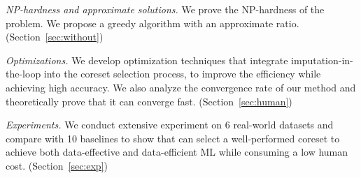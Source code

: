  	\item[(ii)] \textit{NP-hardness and approximate solutions.}
	We prove the NP-hardness of the problem. We propose a greedy algorithm with an approximate ratio. 
	(Section~\ref{sec:without})

	\item[(iii)] \textit{Optimizations.}
	We develop optimization techniques that integrate imputation-in-the-loop into the coreset selection process, to improve the efficiency while achieving high accuracy. We also analyze the convergence rate of our method and theoretically prove that it can converge fast. 
	(Section~\ref{sec:human})



	\item[(iv)] \textit{Experiments.}
	We conduct extensive experiment on 6 real-world datasets and compare with 10 baselines to show that \ours can select a well-performed coreset to achieve both data-effective and data-efficient ML while consuming a low human cost. 
	(Section~\ref{sec:exp})
\ee








